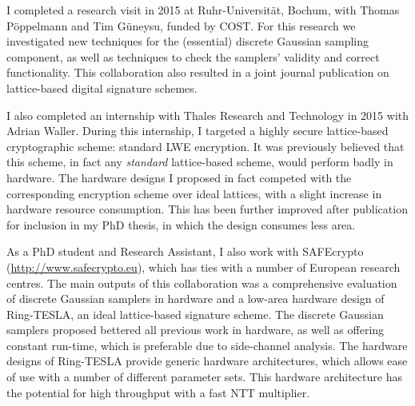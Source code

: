 \documentclass[10pt,a4paper]{moderncv}
\begin{document}

\vspace{0.25cm}

I completed a research visit in 2015 at Ruhr-Universit\"{a}t, Bochum, with Thomas P\"{o}ppelmann and Tim G\"{u}neysu, funded by COST. For this research we investigated new techniques for the (essential) discrete Gaussian sampling component, as well as techniques to check the samplers' validity and correct functionality. This collaboration also resulted in a joint journal publication on lattice-based digital signature schemes. 

\vspace{0.25cm}

I also completed an internship with Thales Research and Technology in 2015 with Adrian Waller. During this internship, I targeted a highly secure lattice-based cryptographic scheme: standard LWE encryption. It was previously believed that this scheme, in fact any \emph{standard} lattice-based scheme, would perform badly in hardware. The hardware designs I proposed in fact competed with the corresponding encryption scheme over ideal lattices, with a slight increase in hardware resource consumption. This has been further improved after publication for inclusion in my PhD thesis, in which the design consumes less area. 

\vspace{0.25cm}

As a PhD student and Research Assistant, I also work with SAFEcrypto (\url{http://www.safecrypto.eu}), which has ties with a number of European research centres. The main outputs of this collaboration was a comprehensive evaluation of discrete Gaussian samplers in hardware and a low-area hardware design of Ring-TESLA, an ideal lattice-based signature scheme. The discrete Gaussian samplers proposed bettered all previous work in hardware, as well as offering constant run-time, which is preferable due to side-channel analysis. The hardware designs of Ring-TESLA provide generic hardware architectures, which allows ease of use with a number of different parameter sets. This hardware architecture has the potential for high throughput with a fast NTT multiplier. %
\end{document}
